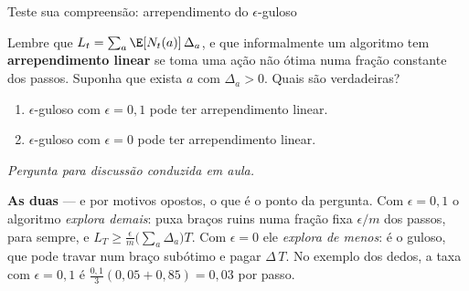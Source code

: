 \documentclass[aspectratio=169, 10pt]{beamer}
\newcommand{\paradiscussao}{\smallskip
  {\footnotesize\color{rlCinza}\itshape Pergunta para discussão conduzida em aula.}}
\newcommand{\Nc}{N}                         %
\newcommand{\gap}{\Delta}
\newcommand{\Reg}{L}
\begin{document}
\begin{frame}{Teste sua compreensão: arrependimento do $\epsilon$-guloso}
  \begin{quizbox}{}
    Lembre que $\Reg_t = \sum_{a} \E[\Nc_t(a)]\,\gap_a$, e que
    informalmente um algoritmo tem \textbf{arrependimento linear} se toma
    uma ação não ótima numa fração constante dos passos. Suponha que
    exista $a$ com $\gap_a > 0$. Quais são verdadeiras?
    \begin{enumerate}\setlength{\itemsep}{0.15ex}
      \item $\epsilon$-guloso com $\epsilon = 0{,}1$ pode ter
            arrependimento linear.
      \item $\epsilon$-guloso com $\epsilon = 0$ pode ter arrependimento
            linear.
    \end{enumerate}
    \paradiscussao
  \end{quizbox}

  \pause

  \begin{respbox}
    \textbf{As duas} --- e por motivos opostos, o que é o ponto da pergunta.
    Com $\epsilon = 0{,}1$ o algoritmo \emph{explora demais}: puxa braços
    ruins numa fração fixa $\epsilon/m$ dos passos, para sempre, e
    $\Reg_T \ge \frac{\epsilon}{m}\bigl(\sum_a \gap_a\bigr) T$. Com
    $\epsilon = 0$ ele \emph{explora de menos}: é o guloso, que pode travar
    num braço subótimo e pagar $\gap\,T$. No exemplo dos dedos, a taxa com
    $\epsilon = 0{,}1$ é $\frac{0{,}1}{3}(0{,}05 + 0{,}85) = 0{,}03$ por
    passo.
  \end{respbox}
\end{frame}
\end{document}
